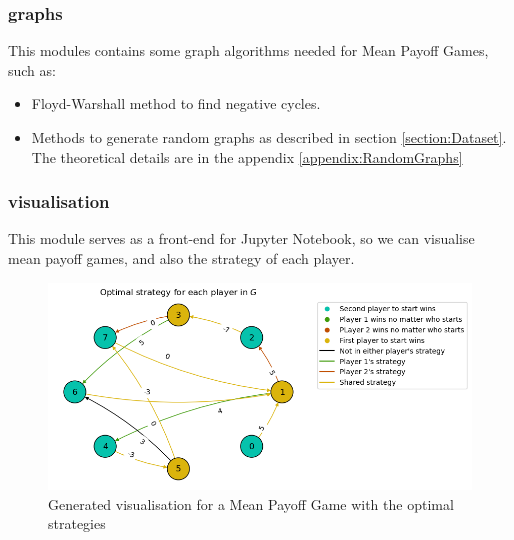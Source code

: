 \subsubsection{graphs}
This modules contains some graph algorithms needed for Mean Payoff Games, such as:
\begin{itemize}
	\item Floyd-Warshall method to find negative cycles.
	\item Methods to generate random graphs as described in section \ref{section:Dataset}. The theoretical details are in the appendix \ref{appendix:RandomGraphs}
\end{itemize}
\subsubsection{visualisation}
This module serves as a front-end for Jupyter Notebook, so we can visualise mean payoff games, and also the strategy of each player.
\begin{figure}[H]
	\includegraphics[width= \textwidth]{Figures/OptimalPlayNetworkx.png}
	\caption{Generated visualisation for a Mean Payoff Game with the optimal strategies}
\end{figure}
\FloatBarrier
